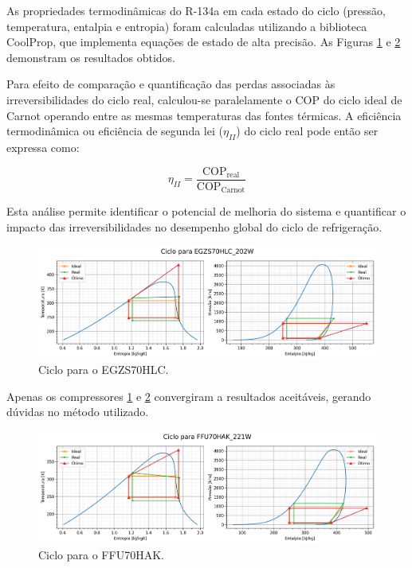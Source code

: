 As propriedades termodinâmicas do R-134a em cada estado do ciclo (pressão, temperatura, entalpia e entropia) foram calculadas utilizando a biblioteca CoolProp, que implementa equações de estado de alta precisão. As Figuras \ref{fig:ciclo comp 1} e \ref{fig:ciclo comp 2} demonstram os resultados obtidos.

Para efeito de comparação e quantificação das perdas associadas às irreversibilidades do ciclo real, calculou-se paralelamente o COP do ciclo ideal de Carnot operando entre as mesmas temperaturas das fontes térmicas. A eficiência termodinâmica ou eficiência de segunda lei ($\eta_{II}$) do ciclo real pode então ser expressa como:

\begin{equation}
    \eta_{II} = \frac{\text{COP}_{\text{real}}}{\text{COP}_{\text{Carnot}}}
    \label{eficiencia segunda lei}
\end{equation}


Esta análise permite identificar o potencial de melhoria do sistema e quantificar o impacto das irreversibilidades no desempenho global do ciclo de refrigeração.

\begin{figure}[ht]
    \centering
    \includegraphics[width=\linewidth]{Imagens/Desenvolvimento/ciclo_EGZS70HLC_202W.png}
    \caption{Ciclo para o EGZS70HLC.}
    \label{fig:ciclo comp 1}
\end{figure}
Apenas os compressores \ref{fig:ciclo comp 1} e \ref{fig:ciclo comp 2} convergiram a resultados aceitáveis, gerando dúvidas no método utilizado.


\begin{figure}[ht]
    \centering
    \includegraphics[width=\linewidth]{Imagens/Desenvolvimento/ciclo_FFU70HAK_221W.png}
    \caption{Ciclo para o FFU70HAK.}
    \label{fig:ciclo comp 2}
\end{figure}



